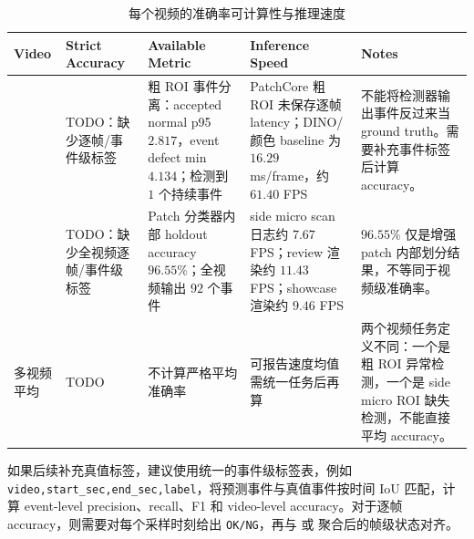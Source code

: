 \documentclass[a4paper,12pt]{article}
\newcommand{\code}[1]{\texttt{#1}}
\begin{document}
\begin{table}[H]
\centering
\caption{每个视频的准确率可计算性与推理速度}
\label{tab:accuracy-speed}
\small
\begin{tabularx}{\textwidth}{L{0.22\textwidth}L{0.18\textwidth}L{0.20\textwidth}L{0.18\textwidth}Y}
\toprule
Video & Strict Accuracy & Available Metric & Inference Speed & Notes \\
\midrule
{} & TODO：缺少逐帧/事件级标签 & 粗 ROI 事件分离：accepted normal p95 $2.817$，event defect min $4.134$；检测到 $1$ 个持续事件 & PatchCore 粗 ROI 未保存逐帧 latency；DINO/颜色 baseline 为 $16.29$ ms/frame，约 $61.40$ FPS & 不能将检测器输出事件反过来当 ground truth。需要补充事件标签后计算 accuracy。 \\
 & TODO：缺少全视频逐帧/事件级标签 & Patch 分类器内部 holdout accuracy $96.55\%$；全视频输出 $92$ 个事件 & side micro scan 日志约 $7.67$ FPS；review 渲染约 $11.43$ FPS；showcase 渲染约 $9.46$ FPS & $96.55\%$ 仅是增强 patch 内部划分结果，不等同于视频级准确率。 \\
多视频平均 & TODO & 不计算严格平均准确率 & 可报告速度均值需统一任务后再算 & 两个视频任务定义不同：一个是粗 ROI 异常检测，一个是 side micro ROI 缺失检测，不能直接平均 accuracy。 \\
\bottomrule
\end{tabularx}
\end{table}

如果后续补充真值标签，建议使用统一的事件级标签表，例如 \code{video,start\_sec,end\_sec,label}，将预测事件与真值事件按时间 IoU 匹配，计算 event-level precision、recall、F1 和 video-level accuracy。对于逐帧 accuracy，则需要对每个采样时刻给出 \code{OK/NG}，再与  或  聚合后的帧级状态对齐。
\end{document}
